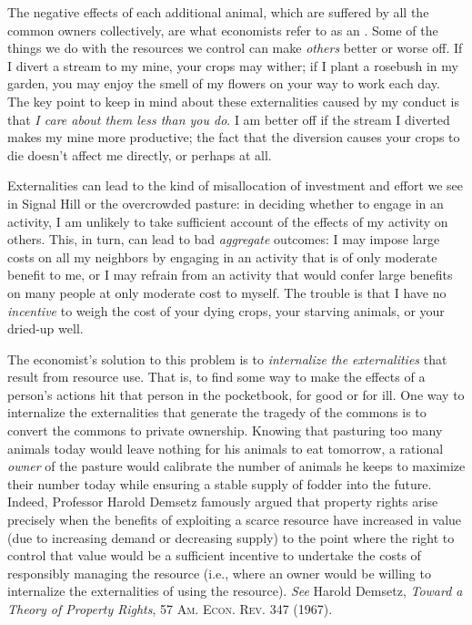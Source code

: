 The negative effects of each additional animal, which are suffered by all the
common owners collectively, are what economists refer to as an
. Some of the things we do with the resources we control can
make \textit{others} better or worse off. If I divert a stream to my mine, your
crops may wither; if I plant a rosebush in my garden, you may enjoy the smell of
my flowers on your way to work each day. The key point to keep in mind about
these externalities caused by my conduct is that \textit{I care about them less
than you do}. I am better off if the stream I diverted makes my mine more
productive; the fact that the diversion causes your crops to die doesn't affect
me directly, or perhaps at all.

Externalities can lead to the kind of misallocation of investment and effort we
see in Signal Hill or the overcrowded pasture: in deciding whether to engage in
an activity, I am unlikely to take sufficient account of the effects of my
activity on others. This, in turn, can lead to bad \textit{aggregate} outcomes:
I may impose large costs on all my neighbors by engaging in an activity that is
of only moderate benefit to me, or I may refrain from an activity that would
confer large benefits on many people at only moderate cost to myself. The
trouble is that I have no \textit{incentive} to weigh the cost of your dying
crops, your starving animals, or your dried-up well.

The economist's solution to this problem is to \textit{internalize the
externalities} that result from resource use. That is, to find some way to make
the effects of a person's actions hit that person in the pocketbook, for good or
for ill. One way to internalize the externalities that generate the tragedy of
the commons is to convert the commons to private ownership. Knowing that
pasturing too many animals today would leave nothing for his animals to eat
tomorrow, a rational \textit{owner} of the pasture would calibrate the number of
animals he keeps to maximize their number today while ensuring a stable supply
of fodder into the future. Indeed, Professor Harold Demsetz famously argued that
property rights arise precisely when the benefits of exploiting a scarce
resource have increased in value (due to increasing demand or decreasing supply)
to the point where the right to control that value would be a sufficient
incentive to undertake the costs of responsibly managing the resource (i.e.,
where an owner would be willing to internalize the externalities of using the
resource). \textit{See} Harold Demsetz, \textit{Toward a Theory of Property
Rights}, 57 \textsc{Am. Econ. Rev}. 347 (1967).

